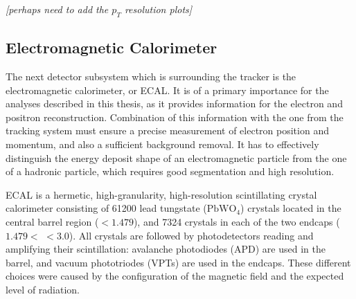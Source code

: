 \textit{[perhaps need to add the $p_T$ resolution plots]}

\subsection{Electromagnetic Calorimeter}
The next detector subsystem which is surrounding the tracker is the electromagnetic calorimeter, or ECAL. It is of a
primary importance for the analyses described in this thesis, as it provides information for the electron and positron
reconstruction. Combination of this information with the one from the tracking system must ensure a precise measurement
of electron position and momentum, and also a sufficient background removal. It has to effectively distinguish the
energy deposit shape of an electromagnetic particle from the one of a hadronic particle, which requires good
segmentation and high resolution.

ECAL is a hermetic, high-granularity, high-resolution scintillating crystal calorimeter consisting of \num{61200} lead
tungstate ($\textrm{PbWO}_4$) crystals located in the central barrel region (\abs\eta $<1.479$), and \num{7324} crystals
in each of the two endcaps ($1.479 <$ \abs\eta $< 3.0$). All crystals are followed by photodetectors reading and
amplifying their scintillation: avalanche photodiodes (APD) are used in the barrel, and vacuum phototriodes (VPTs) are
used in the endcaps. These different choices were caused by the configuration of the magnetic field and the expected
level of radiation.

